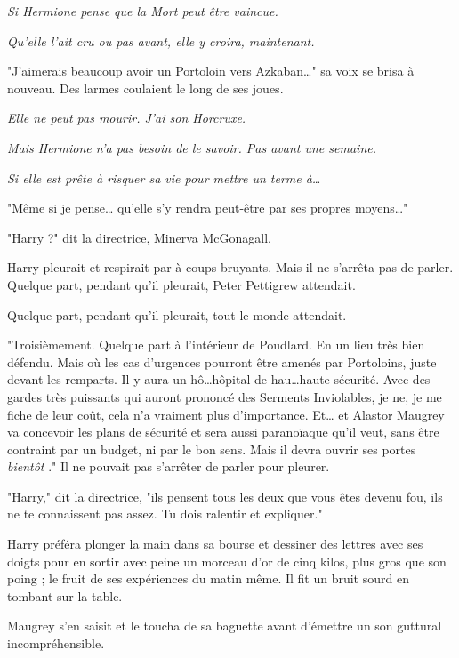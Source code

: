 \emph{Si Hermione pense que la Mort peut être vaincue.} 

\emph{Qu'elle l'ait cru ou pas avant, elle y croira, maintenant.} 

"J'aimerais beaucoup avoir un Portoloin vers Azkaban…" sa voix se brisa à nouveau. Des larmes coulaient le long de ses joues.

\emph{Elle ne peut pas mourir. J'ai son Horcruxe.} 

\emph{Mais Hermione n'a pas besoin de le savoir. Pas avant une semaine.} 

\emph{Si elle est prête à risquer sa vie pour mettre un terme à…} 

"Même si je pense… qu'elle s'y rendra peut-être par ses propres moyens…"

"Harry ?" dit la directrice, Minerva McGonagall.

Harry pleurait et respirait par à-coups bruyants. Mais il ne s'arrêta pas de parler. Quelque part, pendant qu'il pleurait, Peter Pettigrew attendait.

Quelque part, pendant qu'il pleurait, tout le monde attendait.

"Troisièmement. Quelque part à l'intérieur de Poudlard. En un lieu très bien défendu. Mais où les cas d'urgences pourront être amenés par Portoloins, juste devant les remparts. Il y aura un hô…hôpital de hau…haute sécurité. Avec des gardes très puissants qui auront prononcé des Serments Inviolables, je ne, je me fiche de leur coût, cela n'a vraiment plus d'importance. Et… et Alastor Maugrey va concevoir les plans de sécurité et sera aussi paranoïaque qu'il veut, sans être contraint par un budget, ni par le bon sens. Mais il devra ouvrir ses portes \emph{bientôt} ." Il ne pouvait pas s'arrêter de parler pour pleurer.

"Harry," dit la directrice, "ils pensent tous les deux que vous êtes devenu fou, ils ne te connaissent pas assez. Tu dois ralentir et expliquer."

Harry préféra plonger la main dans sa bourse et dessiner des lettres avec ses doigts pour en sortir avec peine un morceau d'or de cinq kilos, plus gros que son poing ; le fruit de ses expériences du matin même. Il fit un bruit sourd en tombant sur la table.

Maugrey s'en saisit et le toucha de sa baguette avant d'émettre un son guttural incompréhensible.

